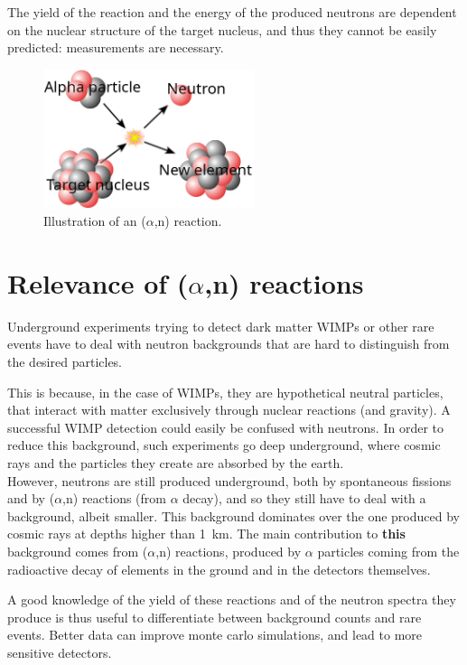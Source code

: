\documentclass[a4paper,12pt]{report}
\newcommand{\an}{($\alpha$,n) }
\begin{document}
The yield of the reaction and the energy of the produced neutrons are dependent on the nuclear structure of the target nucleus, and thus they cannot be easily predicted: measurements are necessary.

\begin{figure}[H]
	\centering
	\includegraphics[width=0.55\textwidth]{anreaction.png}
	\caption{Illustration of an \an reaction.}
	\label{anreaction}
\end{figure}

\section{Relevance of \an reactions}
Underground experiments trying to detect dark matter WIMPs or other rare events have to deal with neutron backgrounds that are hard to distinguish from the desired particles.

This is because, in the case of WIMPs, they are hypothetical neutral particles, that interact with matter exclusively through nuclear reactions (and gravity).
A successful WIMP detection could easily be confused with neutrons.
In order to reduce this background, such experiments go deep underground, where cosmic rays and the particles they create are absorbed by the earth.
\\

However, neutrons are still produced underground, both by spontaneous fissions and by \an reactions (from $\alpha$ decay), and so they still have to deal with a background, albeit smaller.
This background dominates over the one produced by cosmic rays at depths higher than \qty{1}{\kilo\meter}.
The main contribution to \textbf{this} background comes from \an reactions, produced by $\alpha$ particles coming from the radioactive decay of elements in the ground and in the detectors themselves.\cite{neutron_in_an}

A good knowledge of the yield of these reactions and of the neutron spectra they produce is thus useful to differentiate between background counts and rare events.
Better data can improve monte carlo simulations, and lead to more sensitive detectors.
\\
\end{document}
